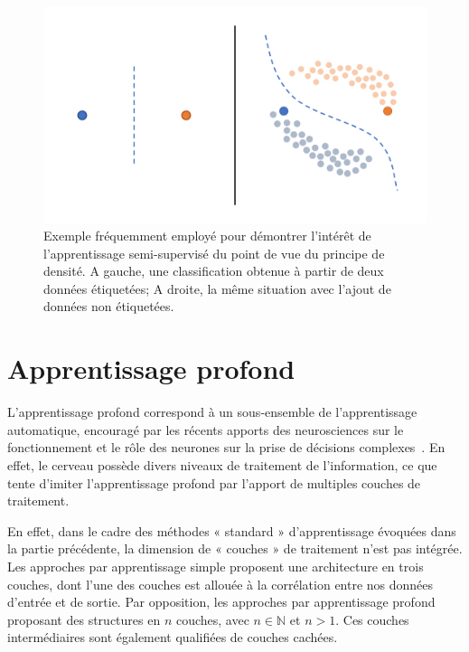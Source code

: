 \begin{figure}[H]
    \centering
    \includegraphics[width=\linewidth]{contents/chapter_3/resources/example_semi_supervised.pdf}
    \caption{Exemple fréquemment employé pour démontrer l'intérêt de l'apprentissage semi-supervisé du point de vue du principe de densité. A gauche, une classification obtenue à partir de deux données étiquetées; A droite, la même situation avec l’ajout de données non étiquetées.}
    \label{fig:example_semi_supervised}
\end{figure}

\clearpage

\section{Apprentissage profond}
\label{sec:deep_learning}
L’apprentissage profond correspond à un sous-ensemble de l’apprentissage automatique, encouragé par les récents apports des neurosciences sur le fonctionnement et le rôle des neurones sur la prise de décisions complexes~\cite{Quartz1997,Shrager1996}. En effet, le cerveau possède divers niveaux de traitement de l’information, ce que tente d'imiter l'apprentissage profond par l'apport de multiples couches de traitement.\par

En effet, dans le cadre des méthodes « standard » d’apprentissage évoquées dans la partie précédente, la dimension de « couches » de traitement n’est pas intégrée. Les approches par apprentissage simple proposent une architecture en trois couches, dont l’une des couches est allouée à la corrélation entre nos données d’entrée et de sortie. Par opposition, les approches par apprentissage profond proposant des structures en $n$ couches, avec $n \in \pmb{\mathbb{N}}$ et $n>1$. Ces couches intermédiaires sont également qualifiées de couches cachées.\par 

